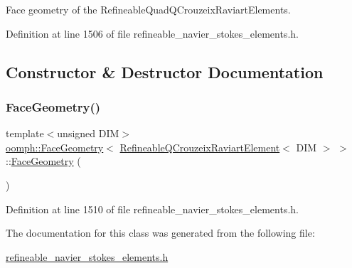 Face geometry of the Refineable\+Quad\+Q\+Crouzeix\+Raviart\+Elements. 

Definition at line 1506 of file refineable\+\_\+navier\+\_\+stokes\+\_\+elements.\+h.



\subsection{Constructor \& Destructor Documentation}
\mbox{\label{classoomph_1_1FaceGeometry_3_01RefineableQCrouzeixRaviartElement_3_01DIM_01_4_01_4_a75b7fc818a28c9d22a5a84461179dfd5}} 
\subsubsection{\texorpdfstring{Face\+Geometry()}{FaceGeometry()}}
{\footnotesize\ttfamily template$<$unsigned D\+IM$>$ \\
\hyperlink{classoomph_1_1FaceGeometry}{oomph\+::\+Face\+Geometry}$<$ \hyperlink{classoomph_1_1RefineableQCrouzeixRaviartElement}{Refineable\+Q\+Crouzeix\+Raviart\+Element}$<$ D\+IM $>$ $>$\+::\hyperlink{classoomph_1_1FaceGeometry}{Face\+Geometry} (\begin{DoxyParamCaption}{ }\end{DoxyParamCaption})\hspace{0.3cm}{\ttfamily [inline]}}



Definition at line 1510 of file refineable\+\_\+navier\+\_\+stokes\+\_\+elements.\+h.



The documentation for this class was generated from the following file\+:\begin{DoxyCompactItemize}
\item 
\hyperlink{refineable__navier__stokes__elements_8h}{refineable\+\_\+navier\+\_\+stokes\+\_\+elements.\+h}\end{DoxyCompactItemize}

